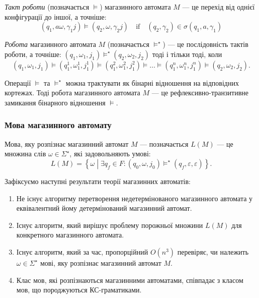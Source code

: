 \textit{Такт роботи} (позначається $\models$) магазинного автомата $M$ --- це перехід від однієї конфігурації до іншої, а точніше:
\begin{equation}
	(q_1, a \omega, \gamma_1 j) \models (q_2, \omega, \gamma_2 j) \quad\text{if}\quad (q_2, \gamma_2) \in \sigma(q_1, a, \gamma_1)
\end{equation}

\textit{Робота} магазинного автомата $M$ (позначається $\models^\star$) --- це послідовність тактів роботи, а точніше: $(q_1, \omega_1, j_1) \models^\star (q_2, \omega_2, j_2)$ тоді і тільки тоді, коли
\begin{equation}
	(q_1, \omega_1, j_1) \models (q_1^1, \omega_1^1, j_1^1) \models (q_1^2, \omega_1^2, j_1^2) \models \ldots \models (q_1^n, \omega_1^n, j_1^n) \models (q_2, \omega_2, j_2).
\end{equation}

Операції $\models$ та $\models^\star$ можна трактувати як бінарні відношення на відповідних кортежах. Тоді робота магазинного автомата $M$ --- це реф\-лек\-сив\-но-транзитивне замикання бінарного відношення $\models$.

\subsubsection{Мова магазинного автомату}

Мова, яку розпізнає магазинний автомат $M$ --- позначається $L(M)$ --- це множина слів $\omega \in \Sigma^\star$, які задовольняють умові:
\begin{equation}
	L(M) = \left\{ \omega \middle| \exists q_f \in F: (q_0, \omega, j_0) \models^\star (q_f, \varepsilon, \varepsilon) \right\}.
\end{equation}

Зафіксуємо наступні результати теорії магазинних автоматів:
\begin{enumerate}
	\item Не існує алгоритму перетворення недетермінованого магазинного автомата у еквівалентний йому детермінований магазинний автомат.
	\item Існує алгоритм, який вирішує проблему порожньої множини $L(M)$ для конкретного магазинного автомата.
	\item Існує алгоритм, який за час, пропорційний $O(n^3)$ перевіряє, чи належить $\omega \in \Sigma^\star$ мові, яку розпізнає магазинний автомат $M$.
	\item Клас мов, які розпізнаються магазинними автоматами, співпадає з класом мов, що породжуються КС-граматиками.
\end{enumerate}

